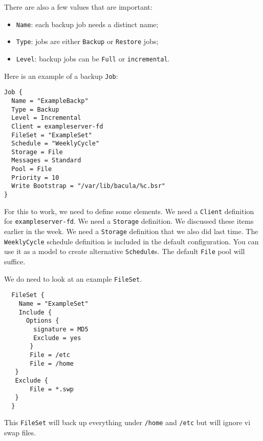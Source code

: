 \documentclass{article}   	%
\begin{document}
There are also a few values that are important:

\begin{itemize}
	\item \texttt{Name}: each backup job needs a distinct name;
	\item \texttt{Type}: jobs are either \texttt{Backup} or \texttt{Restore} jobs;
	\item \texttt{Level}: backup jobs can be \texttt{Full} or \texttt{incremental}.	
\end{itemize}

Here is an example of a backup \texttt{Job}:

\begin{verbatim}
Job {
  Name = "ExampleBackp"
  Type = Backup
  Level = Incremental
  Client = exampleserver-fd
  FileSet = "ExampleSet"
  Schedule = "WeeklyCycle"
  Storage = File
  Messages = Standard
  Pool = File
  Priority = 10
  Write Bootstrap = "/var/lib/bacula/%c.bsr"
}

\end{verbatim}

For this to work, we need to define some elements. We need a \texttt{Client} definition for \texttt{exampleserver-fd}. We need a \texttt{Storage} definition. We discussed these items earlier in the week.  We need a \texttt{Storage} definition that we also did last time.  The \texttt{WeeklyCycle} schedule definition is included in the default configuration.  You can use it as a model to create alternative \texttt{Schedule}s.
The default \texttt{File} pool will suffice.

We do need to look at an example \texttt{FileSet}.
  
  \begin{verbatim}
  FileSet {
    Name = "ExampleSet"
    Include {
      Options {
        signature = MD5
        Exclude = yes
       }
       File = /etc
       File = /home
   }
   Exclude {
       File = *.swp
   }
  }
  \end{verbatim}
  
This \texttt{FileSet} will back up everything under \texttt{/home} and \texttt{/etc} but will ignore vi swap files.
\end{document}
